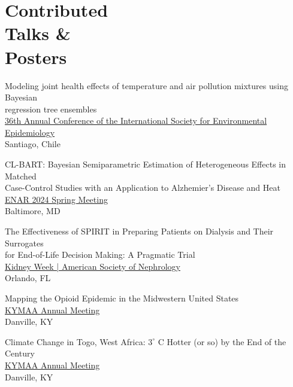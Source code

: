 \section{Contributed \\ Talks \& \\ Posters}

Modeling joint health effects of temperature and air pollution mixtures using Bayesian \\ regression tree ensembles \hfill {} \\
    \indent \quad \href{https://iseeconference.org}{36th Annual Conference of the International Society for Environmental Epidemiology} \\
    \indent \quad Santiago, Chile

CL-BART: Bayesian Semiparametric Estimation of Heterogeneous Effects in Matched \\ Case-Control Studies with an Application to Alzhemier's Disease and Heat \hfill {}\\
    \indent \quad \href{https://www.enar.org/meetings/spring2024/}{ENAR 2024 Spring Meeting}\\
    \indent \quad Baltimore, MD

The Effectiveness of SPIRIT in Preparing Patients on Dialysis and Their Surrogates \\ for End-of-Life Decision Making: A Pragmatic Trial \hfill {}\\
    \indent \quad \href{https://www.asn-online.org/education/kidneyweek/}{Kidney Week | American Society of Nephrology} \\
    \indent \quad Orlando, FL

Mapping the Opioid Epidemic in the Midwestern United States \hfill {}\\
    \indent \quad \href{http://sections.maa.org/kentucky/meetings/indexMeetings.shtml}{KYMAA Annual Meeting} \\ 
    \indent \quad Danville, KY

Climate Change in Togo, West Africa: $3^\circ$ C Hotter (or so) by the End of the Century \hfill {} \\
    \indent \quad \href{http://sections.maa.org/kentucky/meetings/indexMeetings.shtml}{KYMAA Annual Meeting} \\%
    \indent \quad Danville, KY

